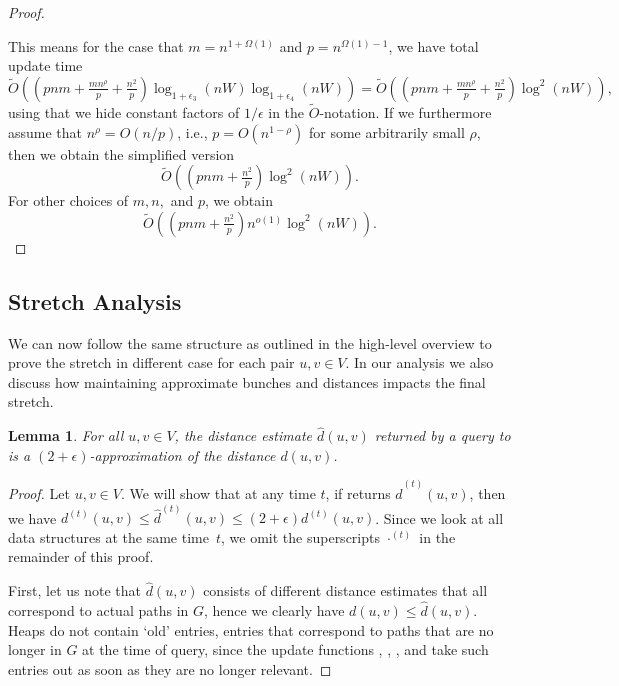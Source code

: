 \documentclass[11pt]{article}
\newtheorem{lemma}[theorem]{Lemma}
\theoremstyle{definition}
\theoremstyle{remark}
\begin{document}
\begin{titlepage}
\begin{proof}
\begin{itemize}
\end{itemize}
This means for the case that $m=n^{1+\Omega(1)}$ and $p=n^{\Omega(1)-1}$, we have total update time
$$ \tilde O ((pnm + \tfrac{mn^{\rho}}{p}  + \tfrac{n^2}{ p})\log_{1+\epsilon_3}(nW)\log_{1+\epsilon_4}(nW)) = \tilde O ((pnm + \tfrac{mn^{\rho}}{p} + \tfrac{n^2}{ p})\log^2(nW)), $$
using that we hide constant factors of $1/\epsilon$ in the $\tilde O$-notation. If we furthermore assume that $n^\rho = O(n/p)$, i.e., $p = O(n^{1-\rho})$ for some arbitrarily small $\rho$, then we obtain the simplified version
$$ \tilde O ((pnm +   \tfrac{n^2}{ p})\log^2(nW)).$$
For other choices of $m,n,$ and $p$, we obtain 
$$ \tilde O ((pnm + \tfrac{n^2}{ p})n^{o(1)}\log^2(nW)). $$
\end{proof}



\subsection{Stretch Analysis}\label{sc:mult_stretch}
We can now follow the same structure as outlined in the high-level overview to prove the stretch in different case for each pair $u,v \in V$. In our analysis we also discuss how maintaining approximate bunches and distances impacts the final stretch.

\begin{lemma}\label{lm:mult_stretch}
    For all $u,v\in V$, the distance estimate $\hat{d}(u,v)$ returned by a query to \DynAPSPtwo is a $(2+\epsilon)$-approximation of the distance $d(u,v)$.
\end{lemma}
\begin{proof}
    Let $u,v \in V$. We will show that at any time $t$, if  returns $\hat d^{(t)}(u,v)$, then we have $d^{(t)}(u,v)\leq \hat d^{(t)}(u,v)\leq (2+\epsilon)d^{(t)}(u,v)$. Since we look at all data structures at the same time~$t$, we omit the superscripts $\cdot^{(t)}$ in the remainder of this proof.
    
    First, let us note that $\hat{d}(u,v)$ consists of different distance estimates that all correspond to actual paths in $G$, hence we clearly have $d(u,v)\leq \hat d(u,v)$. Heaps do not contain `old' entries, entries that correspond to paths that are no longer in $G$ at the time of query, since the update functions \UpdateNbrBunchDSBunchChange, \UpdateNbrBunchDSEdgeChange, \UpdateAdjacentDSMinHeapChange, and \UpdateAdjacentDSBunchChange take such entries out as soon as they are no longer relevant. 
    

\end{proof}
\end{titlepage}
\end{document}
